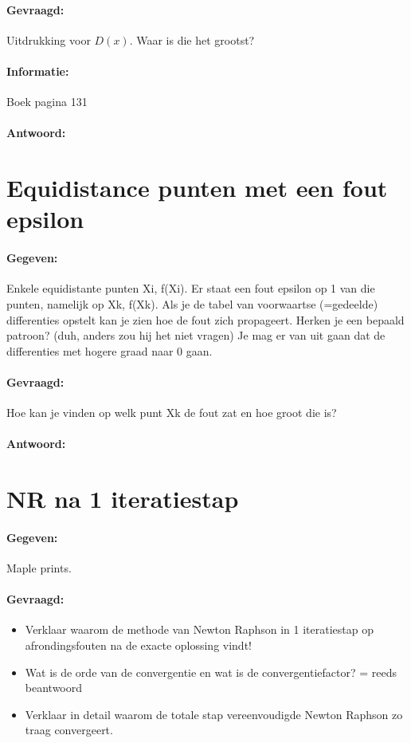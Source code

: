 \documentclass[12pt]{article}
\begin{document}
\paragraph{Gevraagd:} Uitdrukking voor $D(x)$. Waar is die het grootst?
\paragraph{Informatie:} Boek pagina 131
\paragraph{Antwoord:}

\newpage

\section{Equidistance punten met een fout epsilon}
\paragraph{Gegeven:} Enkele equidistante punten Xi, f(Xi). Er staat een fout epsilon op 1 van die punten, namelijk op Xk, f(Xk). Als je de tabel van voorwaartse (=gedeelde) differenties opstelt kan je zien hoe de fout zich propageert. Herken je een bepaald patroon? (duh, anders zou hij het niet vragen) Je mag er van uit gaan dat de differenties met hogere graad naar 0 gaan.
\paragraph{Gevraagd:} Hoe kan je vinden op welk punt Xk de fout zat en hoe groot die is?
\paragraph{Antwoord:}

\newpage

\section{NR na 1 iteratiestap}
\paragraph{Gegeven:} Maple prints.
\paragraph{Gevraagd:}
\begin{itemize}
	\item Verklaar waarom de methode van Newton Raphson in 1 iteratiestap op afrondingsfouten na de exacte oplossing vindt!
	\item Wat is de orde van de convergentie en wat is de convergentiefactor? = reeds beantwoord
	\item Verklaar in detail waarom de totale stap vereenvoudigde Newton Raphson zo traag convergeert.
\end{itemize}
\end{document}
